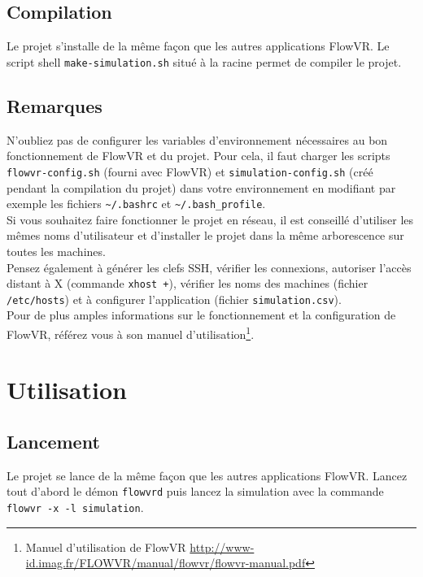 \documentclass[a4paper, 12pt]{article}
\begin{document}
\subsection{Compilation}

Le projet s'installe de la même façon que les autres applications FlowVR. Le
script shell \linebreak \texttt{make-simulation.sh} situé à la racine permet de
compiler le projet.

\subsection{Remarques}

N'oubliez pas de configurer les variables d'environnement nécessaires au bon
fonctionnement de FlowVR et du projet. Pour cela, il faut charger les scripts
\texttt{flowvr-config.sh} (fourni avec FlowVR) et \texttt{simulation-config.sh}
(créé pendant la compilation du projet) dans votre environnement en modifiant
par exemple les fichiers \texttt{\textasciitilde/.bashrc} et
\texttt{\textasciitilde/.bash\_profile}. \\

Si vous souhaitez faire fonctionner le projet en réseau, il est conseillé
d'utiliser les mêmes noms d'utilisateur et d'installer le projet dans la même
arborescence sur toutes les machines. \\

Pensez également à générer les clefs SSH, vérifier les connexions, autoriser
l'accès distant à X (commande \texttt{xhost +}), vérifier les noms des
machines (fichier \texttt{/etc/hosts}) et à configurer l'application (fichier
\texttt{simulation.csv}). \\

Pour de plus amples informations sur le fonctionnement et la configuration de
FlowVR, référez vous à son manuel d'utilisation\footnote{Manuel d'utilisation
de FlowVR \newline
\url{http://www-id.imag.fr/FLOWVR/manual/flowvr/flowvr-manual.pdf}}.

\section{Utilisation}

\subsection{Lancement}

Le projet se lance de la même façon que les autres applications FlowVR. Lancez
tout d'abord le démon \texttt{flowvrd} puis lancez la simulation avec la
commande \texttt{flowvr -x -l simulation}. \\
\end{document}
